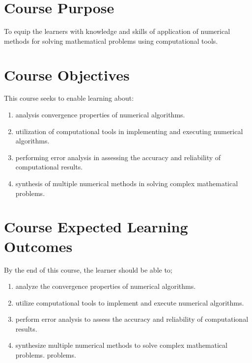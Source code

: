 \section*{Course Purpose}
To equip the learners with knowledge and skills of application of  numerical methods for solving mathematical problems using computational tools.

\section*{Course Objectives}
This course seeks to enable learning about:
\begin{enumerate}[label=(\roman*)]
\item analysis convergence properties of numerical algorithms.
\item utilization of computational tools in implementing and executing numerical algorithms.
\item performing error analysis in assessing the accuracy and reliability of computational results.
\item synthesis of multiple numerical methods in solving complex mathematical problems.
\end{enumerate}

\section*{Course Expected Learning Outcomes}
By the end of this course, the learner should be able to;
\begin{enumerate}
\item[ELO1.] analyze the convergence properties of numerical algorithms.
\item[ELO2.] utilize computational tools to implement and execute numerical algorithms.
\item[ELO3.] perform error analysis to assess the accuracy and reliability of computational results.
\item[ELO4.] synthesize multiple numerical methods to solve complex mathematical problems.
problems.
\end{enumerate}



